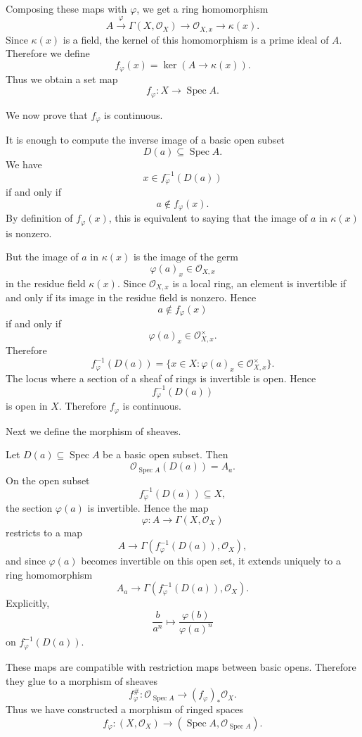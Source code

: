 Composing these maps with \(\varphi\), we get a ring homomorphism
\[
A
\xrightarrow{\varphi}
\Gamma(X,\mathcal O_X)
\longrightarrow
\mathcal O_{X,x}
\longrightarrow
\kappa(x).
\]
Since \(\kappa(x)\) is a field, the kernel of this homomorphism is a prime ideal of \(A\). Therefore we define
\[
f_\varphi(x)
=
\ker\left(A\to \kappa(x)\right).
\]
Thus we obtain a set map
\[
f_\varphi:X\to \operatorname{Spec} A.
\]

We now prove that \(f_\varphi\) is continuous.

It is enough to compute the inverse image of a basic open subset
\[
D(a)\subseteq \operatorname{Spec} A.
\]
We have
\[
x\in f_\varphi^{-1}(D(a))
\]
if and only if
\[
a\notin f_\varphi(x).
\]
By definition of \(f_\varphi(x)\), this is equivalent to saying that the image of \(a\) in \(\kappa(x)\) is nonzero.

But the image of \(a\) in \(\kappa(x)\) is the image of the germ
\[
\varphi(a)_x\in \mathcal O_{X,x}
\]
in the residue field \(\kappa(x)\). Since \(\mathcal O_{X,x}\) is a local ring, an element is invertible if and only if its image in the residue field is nonzero. Hence
\[
a\notin f_\varphi(x)
\]
if and only if
\[
\varphi(a)_x\in \mathcal O_{X,x}^{\times}.
\]
Therefore
\[
f_\varphi^{-1}(D(a))
=
\{x\in X:\varphi(a)_x\in \mathcal O_{X,x}^{\times}\}.
\]
The locus where a section of a sheaf of rings is invertible is open. Hence
\[
f_\varphi^{-1}(D(a))
\]
is open in \(X\). Therefore \(f_\varphi\) is continuous.

Next we define the morphism of sheaves.

Let \(D(a)\subseteq \operatorname{Spec} A\) be a basic open subset. Then
\[
\mathcal O_{\operatorname{Spec} A}(D(a))=A_a.
\]
On the open subset
\[
f_\varphi^{-1}(D(a))\subseteq X,
\]
the section \(\varphi(a)\) is invertible. Hence the map
\[
\varphi:A\to \Gamma(X,\mathcal O_X)
\]
restricts to a map
\[
A\to \Gamma(f_\varphi^{-1}(D(a)),\mathcal O_X),
\]
and since \(\varphi(a)\) becomes invertible on this open set, it extends uniquely to a ring homomorphism
\[
A_a
\longrightarrow
\Gamma(f_\varphi^{-1}(D(a)),\mathcal O_X).
\]
Explicitly,
\[
\frac b{a^n}
\longmapsto
\frac{\varphi(b)}{\varphi(a)^n}
\]
on \(f_\varphi^{-1}(D(a))\).

These maps are compatible with restriction maps between basic opens. Therefore they glue to a morphism of sheaves
\[
f_\varphi^\#:\mathcal O_{\operatorname{Spec} A}\to (f_\varphi)_*\mathcal O_X.
\]
Thus we have constructed a morphism of ringed spaces
\[
f_\varphi:(X,\mathcal O_X)\to (\operatorname{Spec} A,\mathcal O_{\operatorname{Spec} A}).
\]

